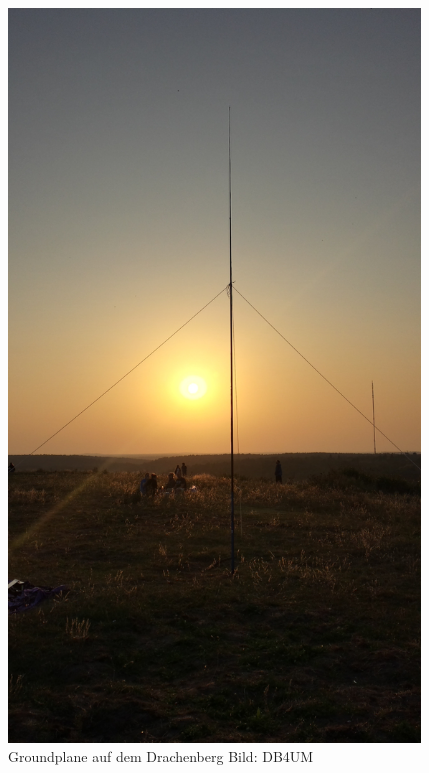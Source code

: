 \begin{frame}
\begin{columns}[c]
\begin{center}
        \includegraphics[width=0.82\textwidth]{a09/db4um_Drachenberg.jpg}\\
        \tiny Groundplane auf dem Drachenberg Bild: DB4UM
    \end{center}
    \end{columns}
\end{frame}

